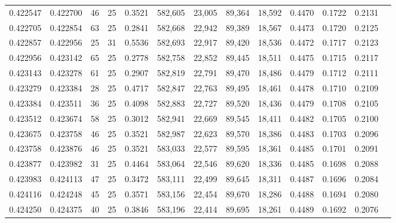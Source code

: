 \begin{tabular}{rrrrrrrrrrrrr}
0.422547 & 0.422700 &    46 &  25 &                                     0.3521 & 582,605 &  23,005 &  89,364 &  18,592 & 0.4470 & 0.1722 & 0.2131 \\
0.422705 & 0.422854 &    63 &  25 &                                     0.2841 & 582,668 &  22,942 &  89,389 &  18,567 & 0.4473 & 0.1720 & 0.2125 \\
0.422857 & 0.422956 &    25 &  31 &                                     0.5536 & 582,693 &  22,917 &  89,420 &  18,536 & 0.4472 & 0.1717 & 0.2123 \\
0.422956 & 0.423142 &    65 &  25 &                                     0.2778 & 582,758 &  22,852 &  89,445 &  18,511 & 0.4475 & 0.1715 & 0.2117 \\
0.423143 & 0.423278 &    61 &  25 &                                     0.2907 & 582,819 &  22,791 &  89,470 &  18,486 & 0.4479 & 0.1712 & 0.2111 \\
0.423279 & 0.423384 &    28 &  25 &                                     0.4717 & 582,847 &  22,763 &  89,495 &  18,461 & 0.4478 & 0.1710 & 0.2109 \\
0.423384 & 0.423511 &    36 &  25 &                                     0.4098 & 582,883 &  22,727 &  89,520 &  18,436 & 0.4479 & 0.1708 & 0.2105 \\
0.423512 & 0.423674 &    58 &  25 &                                     0.3012 & 582,941 &  22,669 &  89,545 &  18,411 & 0.4482 & 0.1705 & 0.2100 \\
0.423675 & 0.423758 &    46 &  25 &                                     0.3521 & 582,987 &  22,623 &  89,570 &  18,386 & 0.4483 & 0.1703 & 0.2096 \\
0.423758 & 0.423876 &    46 &  25 &                                     0.3521 & 583,033 &  22,577 &  89,595 &  18,361 & 0.4485 & 0.1701 & 0.2091 \\
0.423877 & 0.423982 &    31 &  25 &                                     0.4464 & 583,064 &  22,546 &  89,620 &  18,336 & 0.4485 & 0.1698 & 0.2088 \\
0.423983 & 0.424113 &    47 &  25 &                                     0.3472 & 583,111 &  22,499 &  89,645 &  18,311 & 0.4487 & 0.1696 & 0.2084 \\
0.424116 & 0.424248 &    45 &  25 &                                     0.3571 & 583,156 &  22,454 &  89,670 &  18,286 & 0.4488 & 0.1694 & 0.2080 \\
0.424250 & 0.424375 &    40 &  25 &                                     0.3846 & 583,196 &  22,414 &  89,695 &  18,261 & 0.4489 & 0.1692 & 0.2076 \\

\end{tabular}
